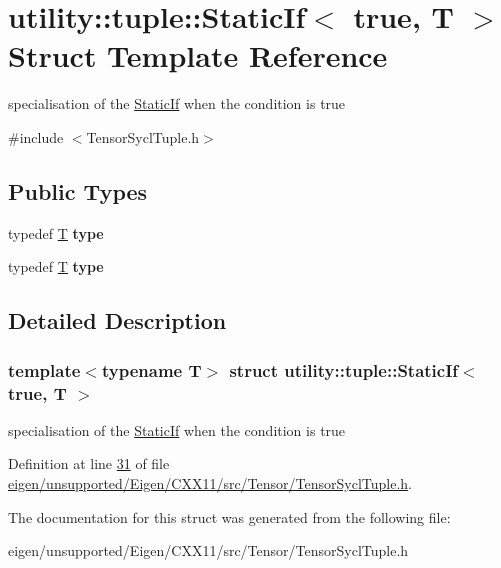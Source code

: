 \hypertarget{structutility_1_1tuple_1_1_static_if_3_01true_00_01_t_01_4}{}\section{utility\+:\+:tuple\+:\+:Static\+If$<$ true, T $>$ Struct Template Reference}
\label{structutility_1_1tuple_1_1_static_if_3_01true_00_01_t_01_4}


specialisation of the \hyperlink{structutility_1_1tuple_1_1_static_if}{Static\+If} when the condition is true  




{\ttfamily \#include $<$Tensor\+Sycl\+Tuple.\+h$>$}

\subsection*{Public Types}
\begin{DoxyCompactItemize}
\item 
\mbox{\label{structutility_1_1tuple_1_1_static_if_3_01true_00_01_t_01_4_adec4aa62531b39cc3c400a7ac82d9492}} 
typedef \hyperlink{group___sparse_core___module}{T} {\bfseries type}
\item 
\mbox{\label{structutility_1_1tuple_1_1_static_if_3_01true_00_01_t_01_4_adec4aa62531b39cc3c400a7ac82d9492}} 
typedef \hyperlink{group___sparse_core___module}{T} {\bfseries type}
\end{DoxyCompactItemize}


\subsection{Detailed Description}
\subsubsection*{template$<$typename T$>$\newline
struct utility\+::tuple\+::\+Static\+If$<$ true, T $>$}

specialisation of the \hyperlink{structutility_1_1tuple_1_1_static_if}{Static\+If} when the condition is true 

Definition at line \hyperlink{eigen_2unsupported_2_eigen_2_c_x_x11_2src_2_tensor_2_tensor_sycl_tuple_8h_source_l00031}{31} of file \hyperlink{eigen_2unsupported_2_eigen_2_c_x_x11_2src_2_tensor_2_tensor_sycl_tuple_8h_source}{eigen/unsupported/\+Eigen/\+C\+X\+X11/src/\+Tensor/\+Tensor\+Sycl\+Tuple.\+h}.



The documentation for this struct was generated from the following file\+:\begin{DoxyCompactItemize}
\item 
eigen/unsupported/\+Eigen/\+C\+X\+X11/src/\+Tensor/\+Tensor\+Sycl\+Tuple.\+h\end{DoxyCompactItemize}
